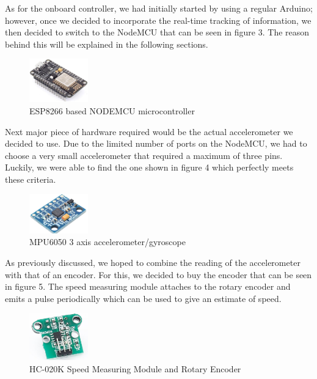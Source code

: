 \documentclass[conference]{IEEEtran}
\begin{document}
    As for the onboard controller, we had initially started by using a
    regular Arduino; however, once we decided to incorporate the real-time
    tracking of information, we then decided to switch to the NodeMCU that
    can be seen in figure 3. The reason behind this will be explained in the
    following sections.

    \begin{figure}[H]
        \centering
        \captionsetup{justification=centering}
        \centering
        \includegraphics[width=1in]{3.jpg}
        \caption{ESP8266 based NODEMCU microcontroller}  
        \label{3}
    \end{figure}

    Next major piece of hardware required would be the actual accelerometer
    we decided to use. Due to the limited number of ports on the NodeMCU, 
    we had to choose a very small accelerometer that required a maximum of
    three pins. Luckily, we were able to find the one shown in figure 4
    which perfectly meets these criteria.

    \begin{figure}[H]
        \centering
        \captionsetup{justification=centering}
        \centering
        \includegraphics[width=1in]{4.png}
        \caption{MPU6050 3 axis accelerometer/gyroscope}  
        \label{4}
    \end{figure}

    As previously discussed, we hoped to combine the reading of the accelerometer
    with that of an encoder. For this, we decided to buy the encoder that can
    be seen in figure 5. The speed measuring module attaches to the rotary
    encoder and emits a pulse periodically which can be used to give an
    estimate of speed.

    \begin{figure}[H]
        \centering
        \captionsetup{justification=centering}
        \centering
        \includegraphics[width=1in]{5.png}
        \caption{HC-020K Speed Measuring Module and Rotary Encoder}  
        \label{5}
    \end{figure}
\end{document}
